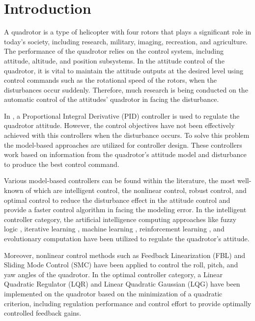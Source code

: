 \documentclass[conference]{IEEEtran}
\begin{document}
\section{Introduction}

\noindent A quadrotor is a type of helicopter with four rotors that plays a significant role in today's society, including research, military, imaging, recreation, and agriculture. The performance of the quadrotor relies on the control system, including attitude, altitude, and position subsystems. In the attitude control of the quadrotor, it is vital to maintain the attitude outputs at the desired level using control commands such as the rotational speed of the rotors, when the disturbances occur suddenly. Therefore, much research is being conducted on the automatic control of the attitudes' quadrotor in facing the disturbance.


     In \cite{PID}, a Proportional Integral Derivative (PID) controller is used to regulate the quadrotor attitude. However, the control objectives have not been effectively achieved with this controllers when the disturbance occurs. To solve this problem the model-based approaches \cite{model_base} are utilized for controller design. These controllers work based on information from the quadrotor's attitude model and disturbance to produce the best control command.


     Various model-based controllers can be found within the literature, the most well-known of which are intelligent control, the nonlinear control, robust control, and optimal control to reduce the disturbance effect in the attitude control and provide a faster control algorithm in facing the modeling error. In the intelligent controller category, the artificial intelligence computing approaches like fuzzy logic \cite{fuzzy}, iterative learning \cite{iterative_Learning}, machine learning \cite{machine_learning}, reinforcement learning \cite{Reinforcement_Learning}, and evolutionary computation \cite{Evolutionary} have been utilized to regulate the quadrotor's attitude.


     Moreover, nonlinear control methods such as  Feedback Linearization (FBL) \cite{FBL} and Sliding Mode Control (SMC) \cite{SMC} have been applied to control the roll, pitch, and yaw angles of the quadrotor. In the optimal controller category, a Linear Quadratic Regulator (LQR) \cite{LQR} and Linear Quadratic Gaussian (LQG) \cite{LQG} have been implemented on the quadrotor based on the minimization of a quadratic criterion, including regulation performance and control effort to provide optimally controlled feedback gains. 
\end{document}
